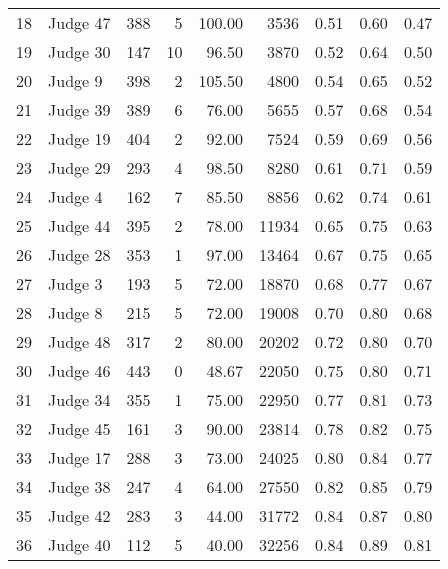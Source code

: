 \begin{tabular}{llrrrrrrr}
18 &  Judge 47 &   388 &      5 & 100.00 &          3536 &       0.51 &        0.60 &        0.47 \\
19 &  Judge 30 &   147 &     10 &  96.50 &          3870 &       0.52 &        0.64 &        0.50 \\
20 &   Judge 9 &   398 &      2 & 105.50 &          4800 &       0.54 &        0.65 &        0.52 \\
21 &  Judge 39 &   389 &      6 &  76.00 &          5655 &       0.57 &        0.68 &        0.54 \\
22 &  Judge 19 &   404 &      2 &  92.00 &          7524 &       0.59 &        0.69 &        0.56 \\
23 &  Judge 29 &   293 &      4 &  98.50 &          8280 &       0.61 &        0.71 &        0.59 \\
24 &   Judge 4 &   162 &      7 &  85.50 &          8856 &       0.62 &        0.74 &        0.61 \\
25 &  Judge 44 &   395 &      2 &  78.00 &         11934 &       0.65 &        0.75 &        0.63 \\
26 &  Judge 28 &   353 &      1 &  97.00 &         13464 &       0.67 &        0.75 &        0.65 \\
27 &   Judge 3 &   193 &      5 &  72.00 &         18870 &       0.68 &        0.77 &        0.67 \\
28 &   Judge 8 &   215 &      5 &  72.00 &         19008 &       0.70 &        0.80 &        0.68 \\
29 &  Judge 48 &   317 &      2 &  80.00 &         20202 &       0.72 &        0.80 &        0.70 \\
30 &  Judge 46 &   443 &      0 &  48.67 &         22050 &       0.75 &        0.80 &        0.71 \\
31 &  Judge 34 &   355 &      1 &  75.00 &         22950 &       0.77 &        0.81 &        0.73 \\
32 &  Judge 45 &   161 &      3 &  90.00 &         23814 &       0.78 &        0.82 &        0.75 \\
33 &  Judge 17 &   288 &      3 &  73.00 &         24025 &       0.80 &        0.84 &        0.77 \\
34 &  Judge 38 &   247 &      4 &  64.00 &         27550 &       0.82 &        0.85 &        0.79 \\
35 &  Judge 42 &   283 &      3 &  44.00 &         31772 &       0.84 &        0.87 &        0.80 \\
36 &  Judge 40 &   112 &      5 &  40.00 &         32256 &       0.84 &        0.89 &        0.81 \\

\end{tabular}
